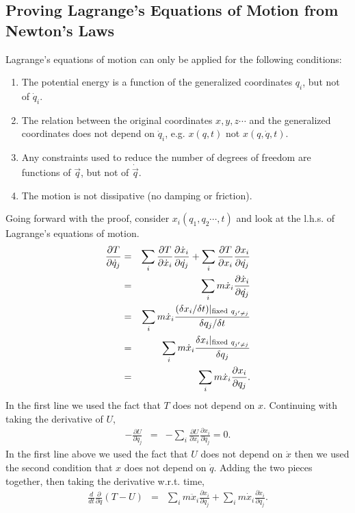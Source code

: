 \subsection{Proving Lagrange's Equations of Motion from Newton's Laws}

Lagrange's equations of motion can only be applied for the following
conditions:
\begin{enumerate}
\item The potential energy is a function of the generalized
  coordinates $q_i$, but not of $\dot{q}_i$.
\item The relation between the original coordinates $x,y,z\cdots$ and
  the generalized coordinates does not depend on $\dot{q}_i$,
  e.g. $x(q,t)$ not $x(q,\dot{q},t)$.
\item Any constraints used to reduce the number of degrees of freedom
  are functions of $\vec{q}$, but not of $\dot{\vec{q}}$.
\item The motion is not dissipative (no damping or friction).
\end{enumerate}
Going forward with the proof, consider $x_i(q_1,q_2\cdots,t)$ and look
at the l.h.s. of Lagrange's equations of motion.
\begin{eqnarray}
\label{eq:lagrangederivation1}
\frac{\partial T}{\partial\dot{q}_j}&=&\sum_i\frac{\partial
  T}{\partial\dot{x}_i}\frac{\partial\dot{x}_i}{\partial\dot{q_j}}
+\sum_i\frac{\partial T}{\partial x_i}\frac{\partial
  x_i}{\partial\dot{q_j}}\\ \nonumber &=&\sum_i
m\dot{x}_i\frac{\partial \dot{x}_i}{\partial\dot{q_j}}\\ \nonumber
&=&\sum_i m\dot{x}_i\frac{(\delta x_i/\delta t)|_{{\rm fixed~}q_{j'\ne
      j}}}{\delta q_j/\delta t}\\ \nonumber
&=&\sum_im\dot{x}_i\frac{\delta{x}_i|_{{\rm fixed~}q_{j'\ne
      j}}}{\delta q_j}\\ \nonumber &=&\sum_i m\dot{x}_i\frac{\partial
  x_i}{\partial q_j}.
\end{eqnarray}
In the first line we used the fact that $T$ does not depend on
$x$. Continuing with taking the derivative of $U$,
\begin{eqnarray}
-\frac{\partial U}{\partial\dot{q}_j}&=&-\sum_i\frac{\partial
  U}{\partial x_i}\frac{\partial x_i}{\partial\dot{q}_j}=0.
\end{eqnarray}
In the first line above we used the fact that $U$ does not depend on
$\dot{x}$ then we used the second condition that $x$ does not depend
on $\dot{q}$. Adding the two pieces together, then taking the
derivative w.r.t. time,
\begin{eqnarray}
\nonumber
\frac{d}{dt}\frac{\partial}{\partial\dot{q}}(T-U)&=&\sum_im\ddot{x}_i\frac{\partial
  x_i}{\partial q_j} +\sum_i
m\dot{x}_i\frac{\partial\dot{x}_i}{\partial q_j}.
\end{eqnarray}

